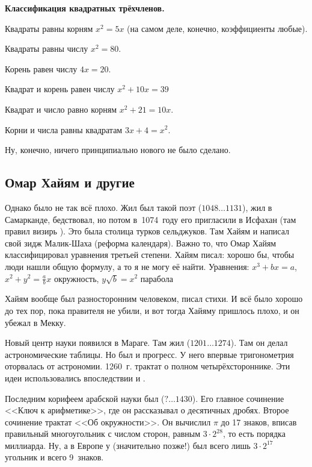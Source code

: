 \documentclass[a4paper,oneside,fleqn,10pt]{article}
\newcommand{\pe}[2]{${#1}\ldots{#2}$}
\begin{document}
\textbf{Классификация квадратных трёхчленов.}

\begin{items}{-2}
\item Квадраты равны корням $x^2 = 5x$ (на самом деле, конечно,
  коэффициенты любые).
\item Квадраты равны числу $x^2 = 80$.
\item Корень равен числу $4x = 20$.
\item Квадрат и корень равен числу $x^2 + 10x = 39$
\item Квадрат и число равно корням $x^2 + 21 = 10x$.
\item Корни и числа равны квадратам $3x + 4 = x^2$.
\end{items}

Ну, конечно, ничего принципиально нового не было сделано.

\subsection{Омар Хайям и другие}

Однако было не так всё плохо. Жил был такой поэт  (\pe{1048}{1131}), жил в Самарканде, бедствовал, но
потом в~1074~году его пригласили в Исфахан (там правил визирь
). Это была столица турков сельджуков.  Там Хайям
и написал свой зидж Малик-Шаха (реформа календаря).  Важно то, что
Омар Хайям классифицировал уравнения третьей степени.  Хайям писал:
хорошо бы, чтобы люди нашли общую формулу, а то я не могу её найти.
Уравнения: $x^3 + bx = a$, $x^2 + y^2 = \frac{a}{b} x$ окружность, $y
\sqrt b = x^2$ парабола

Хайям вообще был разносторонним человеком, писал стихи.  И всё было
хорошо до тех пор, пока правителя не убили, и вот тогда Хайяму
пришлось плохо, и он убежал в Мекку.

Новый центр науки появился в Мараге. Там жил 
(\pe{1201}{1274}).  Там он делал астрономические таблицы.  Но был и
прогресс. У него впервые тригонометрия оторвалась от астрономии.
1260~г. трактат о полном четырёхстороннике.  Эти идеи использовались
впоследствии  и
.

Последним корифеем арабской науки был 
(\pe{?}{1430}).  Его главное сочинение <<Ключ к арифметике>>, где он
рассказывал о десятичных дробях.  Второе сочинение трактат <<Об
окружности>>. Он вычислил $\pi$ до 17 знаков, вписав правильный
многоугольник с числом сторон, равным $3\cdot 2^{28}$, то есть порядка
миллиарда.  Ну, а в Европе у  (значительно позже!)
был всего лишь $3\cdot 2^{17}$ угольник и всего 9~знаков.
\end{document}
